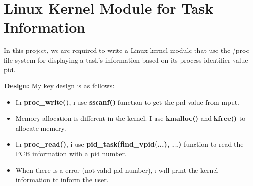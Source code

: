 \documentclass[UTF8,10pt,a4paper]{article}
\theoremstyle{Problem}
\theoremstyle{Solution}
\begin{document}
\section{Linux Kernel Module for Task Information}
In this project, we are required to write a Linux kernel module that use the /proc file system for displaying a task’s information based on its process identifier value pid.

\textbf{Design:} My key design is as follows:
\begin{itemize}
    \item In \textbf{proc\_write()}, i use \textbf{sscanf()} function to get the pid value from input.
    
    \item Memory allocation is different in the kernel. I use \textbf{kmalloc()} and \textbf{kfree()} to allocate memory.
    
    \item In \textbf{proc\_read()}, i use \textbf{pid\_task(find\_vpid(...), ...)} function to read the PCB information with a pid number.
    
    \item When there is a error (not valid pid number), i will print the kernel information to inform the user.
\end{itemize}
\end{document}
